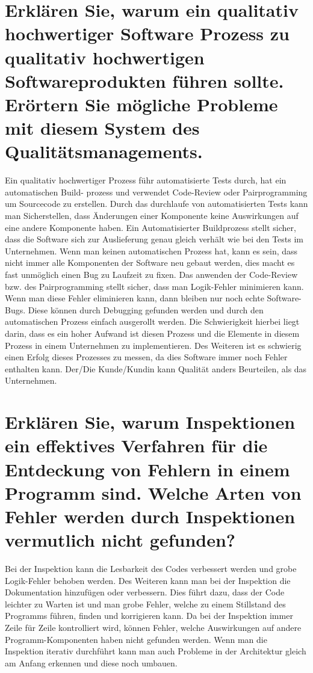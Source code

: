 \documentclass[12pt]{article}
\begin{document}
\section{Erklären Sie, warum ein qualitativ hochwertiger Software Prozess zu qualitativ hochwertigen Softwareprodukten führen sollte. Erörtern Sie mögliche Probleme mit diesem System des Qualitätsmanagements.}
Ein qualitativ hochwertiger Prozess führ automatisierte Tests durch, hat ein automatischen Build- prozess und verwendet Code-Review oder Pairprogramming um Sourcecode zu erstellen. Durch das durchlaufe von automatisierten Tests kann man Sicherstellen, dass Änderungen einer Komponente keine Auswirkungen auf eine andere Komponente haben. Ein Automatisierter Buildprozess stellt sicher, dass die Software sich zur Auslieferung genau gleich verhält wie bei den Tests im Unternehmen. Wenn man keinen automatischen Prozess hat, kann es sein, dass nicht immer alle Komponenten der Software neu gebaut werden, dies macht es fast unmöglich einen Bug zu Laufzeit zu fixen. Das anwenden der Code-Review bzw. des Pairprogramming stellt sicher, dass man Logik-Fehler minimieren kann. Wenn man diese Fehler eliminieren kann, dann bleiben nur noch echte Software-Bugs. Diese können durch Debugging gefunden werden und durch den automatischen Prozess einfach ausgerollt werden. Die Schwierigkeit hierbei liegt darin, dass es ein hoher Aufwand ist diesen Prozess und die Elemente in diesem Prozess in einem Unternehmen zu implementieren. Des Weiteren ist es schwierig einen Erfolg dieses Prozesses zu messen, da dies Software immer noch Fehler enthalten kann. Der/Die Kunde/Kundin kann Qualität anders Beurteilen, als das Unternehmen.
\pagebreak
\section{Erklären Sie, warum Inspektionen ein effektives Verfahren für die Entdeckung von Fehlern in einem Programm sind. Welche Arten von Fehler werden durch Inspektionen vermutlich nicht gefunden?}
Bei der Inspektion kann die Lesbarkeit des Codes verbessert werden und grobe Logik-Fehler behoben werden. Des Weiteren kann man bei der Inspektion die Dokumentation hinzufügen oder verbessern. Dies führt dazu, dass der Code leichter zu Warten ist und man grobe Fehler, welche zu einem Stillstand des Programms führen, finden und korrigieren kann. Da bei der Inspektion immer Zeile für Zeile kontrolliert wird, können Fehler, welche Auswirkungen auf andere Programm-Komponenten haben nicht gefunden werden. Wenn man die Inspektion iterativ durchführt kann man auch Probleme in der Architektur gleich am Anfang erkennen und diese noch umbauen.
\end{document}
